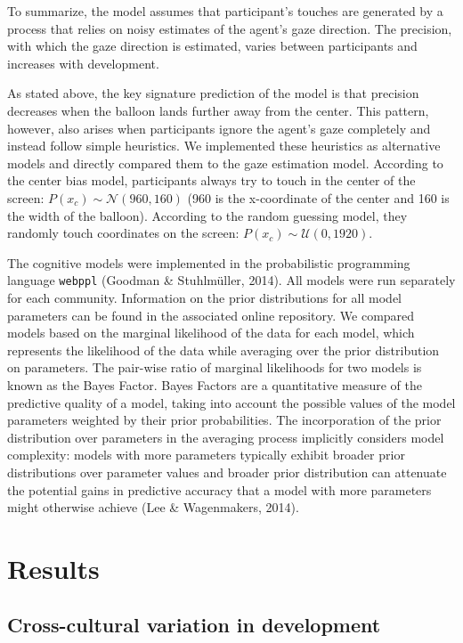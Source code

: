 \documentclass[
  man,floatsintext]{apa7}
\begin{document}
To summarize, the model assumes that participant's touches are generated by a process that relies on noisy estimates of the agent's gaze direction. The precision, with which the gaze direction is estimated, varies between participants and increases with development.

As stated above, the key signature prediction of the model is that precision decreases when the balloon lands further away from the center. This pattern, however, also arises when participants ignore the agent's gaze completely and instead follow simple heuristics. We implemented these heuristics as alternative models and directly compared them to the gaze estimation model. According to the center bias model, participants always try to touch in the center of the screen: \(P(x_c) \sim \mathcal{N}(960, 160)\) (960 is the x-coordinate of the center and 160 is the width of the balloon). According to the random guessing model, they randomly touch coordinates on the screen: \(P(x_c) \sim \mathcal{U}(0, 1920)\).

The cognitive models were implemented in the probabilistic programming language \texttt{webppl} (Goodman \& Stuhlmüller, 2014). All models were run separately for each community. Information on the prior distributions for all model parameters can be found in the associated online repository. We compared models based on the marginal likelihood of the data for each model, which represents the likelihood of the data while averaging over the prior distribution on parameters. The pair-wise ratio of marginal likelihoods for two models is known as the Bayes Factor. Bayes Factors are a quantitative measure of the predictive quality of a model, taking into account the possible values of the model parameters weighted by their prior probabilities. The incorporation of the prior distribution over parameters in the averaging process implicitly considers model complexity: models with more parameters typically exhibit broader prior distributions over parameter values and broader prior distribution can attenuate the potential gains in predictive accuracy that a model with more parameters might otherwise achieve (Lee \& Wagenmakers, 2014).

\section{Results}\label{results}

\subsection{Cross-cultural variation in development}\label{cross-cultural-variation-in-development}
\end{document}
